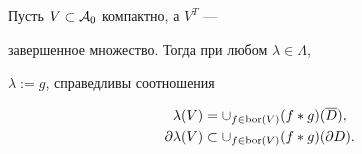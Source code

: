 \begin{thm}


Пусть $V\subset{\cal A}_0$ компактно, а $V^T$ ---


завершенное множество. Тогда при любом $\lambda \in \Lambda$, 


$\lambda:=g$, справедливы соотношения 


\begin{gather}


\lambda(V)= \cup_{f \in \bor(V)} (f*g)(\overline{D}), \\


%


\partial\lambda(V) \subset \cup_{f \in \bor(V)}


(f*g)(\partial D).


\end{gather}


\end{thm}





